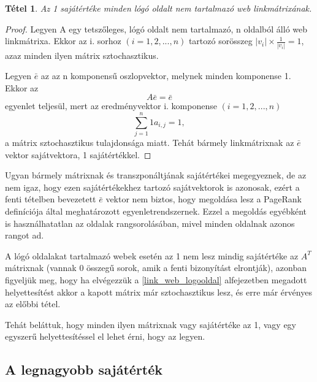 \documentclass[12pt,a4paper]{article}
\newtheorem{tetel}{Tétel}
\begin{document}
\begin{tetel}
	Az 1 sajátértéke minden lógó oldalt nem tartalmazó web linkmátrixának.
\end{tetel}
\vspace{-1cm}
\begin{proof}
	Legyen A egy tetszőleges, lógó oldalt nem tartalmazó, n oldalból álló web linkmátrixa. Ekkor az i. sorhoz $(i = 1,2,...,n)$ tartozó sorösszeg $ |v_i| \times \frac{1}{|v_i|} = 1 $, azaz minden ilyen mátrix sztochasztikus.
	
	Legyen $\bar{e}$ az az n komponensű oszlopvektor, melynek minden komponense 1. Ekkor az
	\[ A \bar{e} = \bar{e} \] 
	egyenlet teljesül, mert az eredményvektor i. komponense $(i = 1,2,...,n)$
	\[ \sum_{j=1}^{n}{1 a_{i,j} } = 1, \] 
	a mátrix sztochasztikus tulajdonsága miatt. Tehát bármely linkmátrixnak az $\bar{e}$ vektor sajátvektora, 1 sajátértékkel.
\end{proof}
\vspace{0.5cm}

Ugyan bármely mátrixnak és transzponáltjának sajátértékei megegyeznek, de az nem igaz, hogy ezen sajátértékekhez tartozó sajátvektorok is azonosak, ezért a fenti tételben bevezetett $\bar{e}$ vektor nem biztos, hogy megoldása lesz a PageRank definíciója által meghatározott egyenletrendszernek. Ezzel a megoldás egyébként is használhatatlan az oldalak rangsorolásában, mivel minden oldalnak azonos rangot ad.

A lógó oldalakat tartalmazó webek esetén az 1 nem lesz mindig sajátértéke az $A^T$ mátrixnak (vannak 0 összegű sorok, amik a fenti bizonyítást elrontják), azonban figyeljük meg, hogy ha elvégezzük a \ref{link_web_logooldal} alfejezetben megadott helyettesítést akkor a kapott mátrix már sztochasztikus lesz, és erre már érvényes az előbbi tétel.

Tehát beláttuk, hogy minden ilyen mátrixnak vagy sajátértéke az 1, vagy egy egyszerű helyettesítéssel el lehet érni, hogy az legyen. 

\subsection{A legnagyobb sajátérték}\label{legnagyobb_sajatertek}
\end{document}
